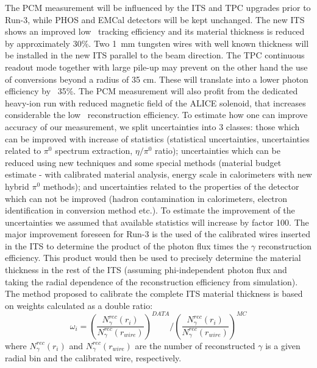 The PCM measurement will be influenced by the ITS and TPC upgrades prior 
to Run-3, while PHOS and EMCal detectors will be kept unchanged. 
The new ITS shows an improved low \pT \ tracking efficiency and its material thickness is reduced by approximately 30\%. Two 1\ mm tungsten wires with well known thickness will be installed in the new ITS parallel to the beam direction. 
The TPC continuous readout mode together with large pile-up may prevent on the other hand the use of conversions beyond a radius of 35 cm. These will translate
into a lower photon efficiency by ~35\%. The PCM measurement will also profit from the dedicated heavy-ion run with reduced magnetic field of the ALICE solenoid, that increases considerable the low \pT \ reconstruction efficiency.
To estimate how one can improve accuracy of our measurement, we split uncertainties into 3 classes: those which can be improved with increase of statistics (statistical uncertainties, uncertainties related to $\pi^0$ spectrum extraction, $\eta/\pi^0$ ratio); uncertainties which can be reduced using new techniques and some special methods (material budget estimate - with calibrated material analysis, energy scale in calorimeters with new hybrid $\pi^0$ methods); and uncertainties related to the properties of the detector which can not be improved (hadron contamination in calorimeters, electron identification in conversion method etc.). To estimate the improvement of the uncertainties we assumed that available statistics will increase by factor 100. 
The major improvement foreseen for Run-3 is the used of the calibrated wires
inserted in the ITS to determine the product of the photon flux times the $\gamma$ reconstruction efficiency. This product would then be used to precisely determine the material thickness in the rest of the ITS (assuming phi-independent photon flux and taking the radial dependence of the reconstruction efficiency from simulation).
The method proposed to calibrate the complete ITS material thickness is based on weights calculated as a double ratio: 
\begin{equation}
\omega_i= 
{\left(\frac{N_\gamma^{rec}(r_i)}{N_\gamma^{rec}(r_{wire})}\right)^{DATA}} /
{\left(\frac{N_\gamma^{rec}(r_i)}{N_\gamma^{rec}(r_{wire})}\right)^{MC}} 
\end{equation}
where $N_\gamma^{rec}(r_i)$ and $N_\gamma^{rec}(r_{wire})$ are the number of reconstructed $\gamma$ is a given radial bin and the calibrated wire, respectively.
